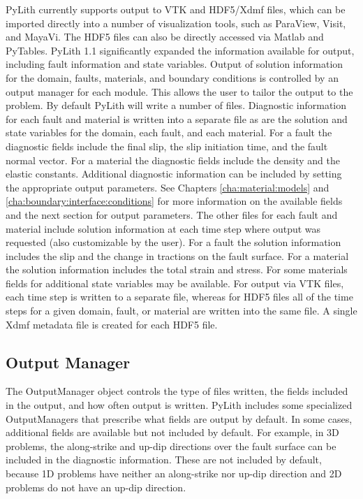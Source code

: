 PyLith currently supports output to VTK and HDF5/Xdmf files, which
can be imported directly into a number of visualization tools, such
as ParaView, Visit, and MayaVi. The HDF5 files can also be directly
accessed via Matlab and PyTables. PyLith 1.1 significantly expanded
the information available for output, including fault information
and state variables. Output of solution information for the domain,
faults, materials, and boundary conditions is controlled by an output
manager for each module. This allows the user to tailor the output
to the problem. By default PyLith will write a number of files. Diagnostic
information for each fault and material is written into a separate
file as are the solution and state variables for the domain, each
fault, and each material. For a fault the diagnostic fields include
the final slip, the slip initiation time, and the fault normal vector.
For a material the diagnostic fields include the density and the elastic
constants. Additional diagnostic information can be included by setting
the appropriate output parameters. See Chapters \ref{cha:material:models}
and \ref{cha:boundary:interface:conditions} for more information
on the available fields and the next section for output parameters.
The other files for each fault and material include solution information
at each time step where output was requested (also customizable by
the user). For a fault the solution information includes the slip
and the change in tractions on the fault surface. For a material the
solution information includes the total strain and stress. For some
materials fields for additional state variables may be available.
For output via VTK files, each time step is written to a separate
file, whereas for HDF5 files all of the time steps for a given domain,
fault, or material are written into the same file. A single Xdmf metadata
file is created for each HDF5 file.


\subsection{Output Manager}

The OutputManager object controls the type of files written, the fields
included in the output, and how often output is written. PyLith includes
some specialized OutputManagers that prescribe what fields are output
by default. In some cases, additional fields are available but not
included by default. For example, in 3D problems, the along-strike
and up-dip directions over the fault surface can be included in the
diagnostic information. These are not included by default, because
1D problems have neither an along-strike nor up-dip direction and
2D problems do not have an up-dip direction.


